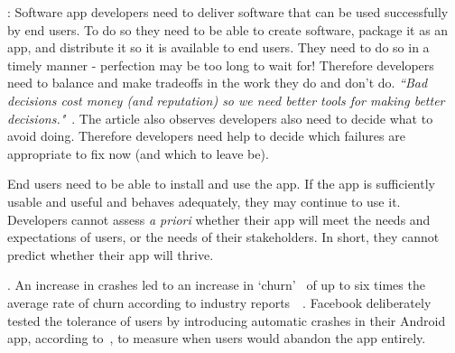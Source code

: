 \medskip
{}: Software app developers need to deliver software that can be used successfully by end users. To do so they need to be able to create software, package it as an app, and distribute it so it is available to end users.
%
They need to do so in a timely manner - perfection may be too long to wait for! Therefore developers need to balance and make tradeoffs in the work they do and don't do. \emph{``Bad decisions cost money (and reputation) so we need better tools for making better decisions."}~. The article also observes developers also need to decide what to avoid doing. Therefore developers need help to decide which failures are appropriate to fix now (and which to leave be).

End users need to be able to install and use the app. If the app is sufficiently usable and useful and behaves adequately, they may continue to use it. Developers cannot assess \emph{a priori} whether their app will meet the needs and expectations of users, or the needs of their stakeholders.
In short, they cannot predict whether their app will thrive.


\medskip
{}. An increase in crashes led to an increase in `churn'~ of up to six times the average rate of churn according to industry reports~~. Facebook deliberately tested the tolerance of users by introducing automatic crashes in their Android app, according to~, to measure when users would abandon the app entirely. %

